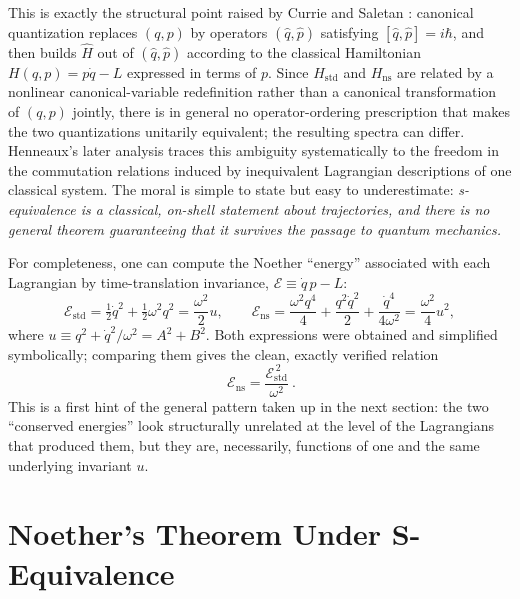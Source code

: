 \documentclass[11pt]{article}
\theoremstyle{remark}
\begin{document}
This is exactly the structural point raised by Currie and Saletan \cite{CurrieSaletan1966}: canonical quantization replaces $(q,p)$ by operators $(\hat q,\hat p)$ satisfying $[\hat q,\hat p]=i\hbar$, and then builds $\hat H$ out of $(\hat q,\hat p)$ according to the classical Hamiltonian $H(q,p)=p\dot q-L$ expressed in terms of $p$. Since $H_{\mathrm{std}}$ and $H_{\mathrm{ns}}$ are related by a nonlinear canonical-variable redefinition rather than a canonical transformation of $(q,p)$ jointly, there is in general no operator-ordering prescription that makes the two quantizations unitarily equivalent; the resulting spectra can differ. Henneaux's later analysis \cite{Henneaux1982} traces this ambiguity systematically to the freedom in the commutation relations induced by inequivalent Lagrangian descriptions of one classical system. The moral is simple to state but easy to underestimate: \emph{s-equivalence is a classical, on-shell statement about trajectories, and there is no general theorem guaranteeing that it survives the passage to quantum mechanics.}

For completeness, one can compute the Noether ``energy'' associated with each Lagrangian by time-translation invariance, $\mathcal E \equiv \dot q\,p-L$:
\begin{equation}
\mathcal E_{\mathrm{std}} = \tfrac12\dot q^2+\tfrac12\omega^2 q^2 = \frac{\omega^2}{2}u, \qquad
\mathcal E_{\mathrm{ns}} = \frac{\omega^2 q^4}{4}+\frac{q^2\dot q^2}{2}+\frac{\dot q^4}{4\omega^2} = \frac{\omega^2}{4}u^2,
\label{eq:energies}
\end{equation}
where $u\equiv q^2+\dot q^2/\omega^2 = A^2+B^2$. Both expressions were obtained and simplified symbolically; comparing them gives the clean, exactly verified relation
\begin{equation}
\boxed{\ \mathcal E_{\mathrm{ns}} = \dfrac{\mathcal E_{\mathrm{std}}^{\,2}}{\omega^2}\ } .
\label{eq:energy-relation}
\end{equation}
This is a first hint of the general pattern taken up in the next section: the two ``conserved energies'' look structurally unrelated at the level of the Lagrangians that produced them, but they are, necessarily, functions of one and the same underlying invariant $u$.

\section{Noether's Theorem Under S-Equivalence}
\end{document}

